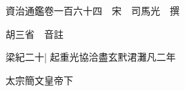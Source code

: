 






























































資治通鑑卷一百六十四　宋　司馬光　撰

胡三省　音註

梁紀二十|{
	起重光協洽盡玄黓涒灘凡二年}


太宗簡文皇帝下

